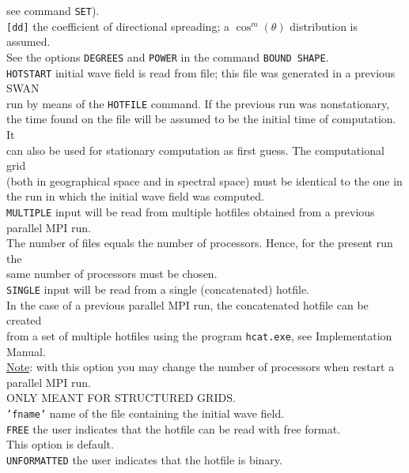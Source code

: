 \documentclass[12pt]{book}
\begin{document}
\begin{tabbing}
                     see command {\tt SET}).\-\\
{\tt [dd]}        \> the coefficient of directional spreading; a $\cos^m (\theta)$ distribution is assumed.\+\\
                     See the options {\tt DEGREES} and {\tt POWER} in the command {\tt BOUND SHAPE}.\-\\
{\tt HOTSTART}    \> initial wave field is read from file; this file was generated in a previous SWAN\+\\
                     run by means of the {\tt HOTFILE} command. If the previous run was nonstationary,\\
                     the time found on the file will be assumed to be the initial time of computation. It\\
                     can also be used for stationary computation as first guess. The computational grid\\
                     (both in geographical space and in spectral space) must be identical to the one in\\
                     the run in which the initial wave field was computed.\-\\
{\tt MULTIPLE}    \> input will be read from multiple hotfiles obtained from a previous parallel MPI run.\+\\
                     The number of files equals the number of processors. Hence, for the present run the\\
                     same number of processors must be chosen.\-\\
{\tt SINGLE}      \> input will be read from a single (concatenated) hotfile.\+\\
                     In the case of a previous parallel MPI run, the concatenated hotfile can be created\\
                     from a set of multiple hotfiles using the program {\tt hcat.exe}, see Implementation\\
                     Manual.\\
                     \underline{Note}: with this option you may change the number of processors when restart a\\
                     parallel MPI run.\\
                     ONLY MEANT FOR STRUCTURED GRIDS.\-\\
{\tt {'fname'}}   \> name of the file containing the initial wave field.\\
{\tt FREE}        \> the user indicates that the hotfile can be read with free format.\+\\
                     This option is default.\-\\
{\tt UNFORMATTED} \> the user indicates that the hotfile is binary.\\
\end{tabbing}
\end{document}
